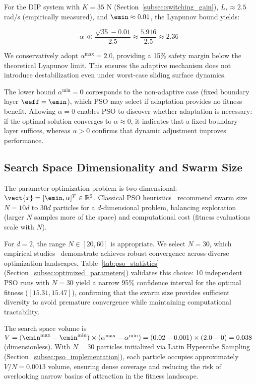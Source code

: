 For the DIP system with $K = 35$ N (Section~\ref{subsec:switching_gain}), $L_s \approx 2.5$ rad/s (empirically measured), and $\emin \approx 0.01$, the Lyapunov bound yields:

\begin{equation}
\label{eq:alpha_numerical_bound}
\alpha \ll \frac{\sqrt{35} - 0.01}{2.5} \approx \frac{5.916}{2.5} \approx 2.36
\end{equation}

We conservatively adopt $\alpha^{\max} = 2.0$, providing a 15\% safety margin below the theoretical Lyapunov limit. This ensures the adaptive mechanism does not introduce destabilization even under worst-case sliding surface dynamics.

The lower bound $\alpha^{\min} = 0$ corresponds to the non-adaptive case (fixed boundary layer $\eeff = \emin$), which PSO may select if adaptation provides no fitness benefit. Allowing $\alpha = 0$ enables PSO to discover whether adaptation is necessary: if the optimal solution converges to $\alpha \approx 0$, it indicates that a fixed boundary layer suffices, whereas $\alpha > 0$ confirms that dynamic adjustment improves performance.

\subsection{Search Space Dimensionality and Swarm Size}
\label{subsec:search_space}

The parameter optimization problem is two-dimensional: $\vect{x} = [\emin, \alpha]^T \in \mathbb{R}^2$. Classical PSO heuristics~\cite{shi1998parameter} recommend swarm size $N = 10d$ to $30d$ particles for a $d$-dimensional problem, balancing exploration (larger $N$ samples more of the space) and computational cost (fitness evaluations scale with $N$).

For $d=2$, the range $N \in [20, 60]$ is appropriate. We select $N=30$, which empirical studies~\cite{eberhart2001swarm} demonstrate achieves robust convergence across diverse optimization landscapes. Table~\ref{tab:pso_statistics} (Section~\ref{subsec:optimized_parameters}) validates this choice: 10 independent PSO runs with $N=30$ yield a narrow 95\% confidence interval for the optimal fitness ($[15.31, 15.47]$), confirming that the swarm size provides sufficient diversity to avoid premature convergence while maintaining computational tractability.

The search space volume is $V = (\emin^{\max} - \emin^{\min}) \times (\alpha^{\max} - \alpha^{\min}) = (0.02 - 0.001) \times (2.0 - 0) = 0.038$ (dimensionless). With $N=30$ particles initialized via Latin Hypercube Sampling (Section~\ref{subsec:pso_implementation}), each particle occupies approximately $V/N = 0.0013$ volume, ensuring dense coverage and reducing the risk of overlooking narrow basins of attraction in the fitness landscape.

